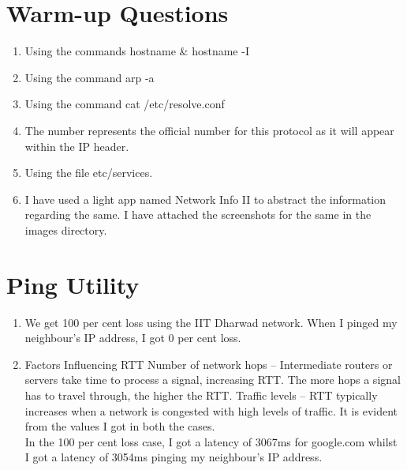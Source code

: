 \documentclass[12pt]{article}
\begin{document}
\maketitle

\section{Warm-up Questions}
\begin{enumerate}[label=(\alph*)]
    \item Using the commands hostname \& hostname -I
    \item Using the command arp -a
    \item Using the command cat /etc/resolve.conf
    \item The number represents the official number for this protocol as it will appear within the IP header.
    \item Using the file etc/services.
    \item I have used a light app named Network Info II to abstract the information regarding the same. I have attached the screenshots for the same in the images directory.
\end{enumerate}

\section{Ping Utility}

    \begin{enumerate}[label=(\alph*)]
        \item We get 100 per cent loss using the IIT Dharwad network. When I pinged my neighbour's IP address, I got 0 per cent loss.
        \item Factors Influencing RTT Number of network hops – Intermediate routers or servers take time to process a signal, increasing RTT. The more hops a signal has to travel through, the higher the RTT. Traffic levels – RTT typically increases when a network is congested with high levels of traffic.
        It is evident from the values I got in both the cases. \\
        In the 100 per cent loss case, I got a latency of 3067ms for google.com whilst I got a latency of 3054ms pinging my neighbour's IP address.
    \end{enumerate}
    
\end{document}
